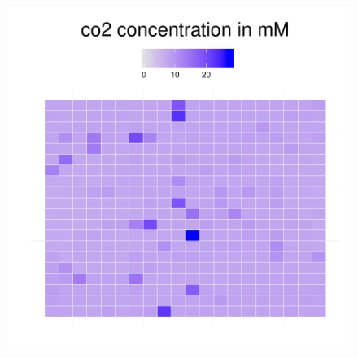 \begin{figure}[h!]
{\begin{minipage}[t]{0.3\textwidth}
  \end{minipage}
  \begin{minipage}[t]{0.3\textwidth}
    \includegraphics[width=\textwidth]{../results/barkeri_20x20_seed9659_co2100a.pdf}
  \end{minipage}
  }
\end{figure}
